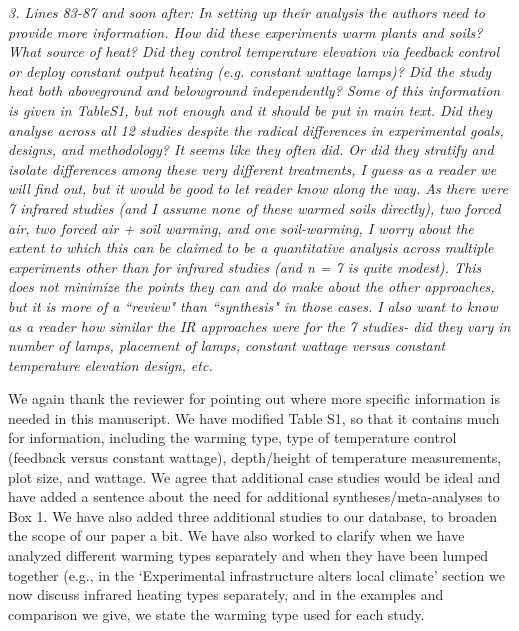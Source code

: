 \documentclass[11pt,a4paper]{letter}
\begin{document}
\emph{3. Lines 83-87 and soon after: In setting up their analysis the authors need to provide more information. How did these experiments warm plants and soils? What source of heat? Did they control temperature elevation via feedback control or deploy constant output heating (e.g. constant wattage lamps)? Did the study heat both aboveground and belowground independently? Some of this information is given in TableS1, but not enough and it should be put in main text. Did they analyse across all 12 studies despite the radical differences in experimental goals, designs, and methodology? It seems like they often did. Or did they stratify and isolate differences among these very different treatments, I guess as a reader we will find out, but it would be good to let reader know along the way. As there were 7 infrared studies (and I assume none of these warmed soils directly), two forced air, two forced air + soil warming, and one soil-warming, I worry about the extent to which this can be claimed to be a quantitative analysis across multiple experiments other than for infrared
studies (and n = 7 is quite modest). This does not minimize the points they can and do make about the other approaches, but it is more of a ``review" than ``synthesis" in those cases. I also want to know as a reader how similar the IR approaches were for the 7 studies- did they vary in number of lamps, placement of lamps, constant wattage versus constant temperature elevation design, etc.}
\par We again thank the reviewer for pointing out where more specific information is needed in this manuscript. We have modified Table S1, so that it contains much for information, including the warming type, type of temperature control (feedback versus constant wattage), depth/height of temperature measurements, plot size, and wattage. We agree that additional case studies would be ideal and have added a sentence about the need for additional syntheses/meta-analyses to Box 1. We have also added three additional studies to our database, to broaden the scope of our paper a bit.  We have also worked to clarify when we have analyzed different warming types separately and when they have been lumped together (e.g., in the `Experimental infrastructure alters local climate' section we now discuss infrared heating types separately, and in the examples and comparison we give, we state the warming type used for each study. 
\end{document}
